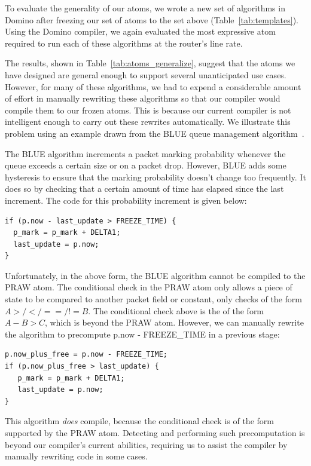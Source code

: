 To evaluate the generality of our atoms, we wrote a new set of algorithms in
Domino after freezing our set of atoms to the set above
(Table~\ref{tab:templates}). Using the Domino compiler, we again evaluated the
most expressive atom required to run each of these algorithms at the router's
line rate.

The results, shown in Table~\ref{tab:atoms_generalize}, suggest that the atoms
we have designed are general enough to support several unanticipated use cases.
However, for many of these algorithms, we had to expend a considerable amount
of effort in manually rewriting these algorithms so that our compiler would
compile them to our frozen atoms. This is because our current compiler is not
intelligent enough to carry out these rewrites automatically. We illustrate
this problem using an example drawn from the BLUE queue management
algorithm~\cite{blue}.

The BLUE algorithm increments a packet marking probability whenever the queue
exceeds a certain size or on a packet drop. However, BLUE adds some hysteresis
to ensure that the marking probability doesn't change too frequently. It does
so by checking that a certain amount of time has elapsed since the last
increment.  The code for this probability increment is given below:

\begin{verbatim}
if (p.now - last_update > FREEZE_TIME) {
  p_mark = p_mark + DELTA1;
  last_update = p.now;
}
\end{verbatim}

Unfortunately, in the above form, the BLUE algorithm cannot be compiled to the
PRAW atom. The conditional check in the PRAW atom only allows a piece of state
to be compared to another packet field or constant, \ie only checks of the form
$A >/</==/!= B$. The conditional check above is the of the form $A - B
> C$, which is beyond the PRAW atom. However, we can manually rewrite the
algorithm to precompute p.now - FREEZE\_TIME in a previous stage:

\begin{verbatim}
p.now_plus_free = p.now - FREEZE_TIME;
if (p.now_plus_free > last_update) {
   p_mark = p_mark + DELTA1;
   last_update = p.now;
}
\end{verbatim}

This algorithm {\em does} compile, because the conditional check is of the form
supported by the PRAW atom. Detecting and performing such precomputation is
beyond our compiler's current abilities, requiring us to assist the compiler by
manually rewriting code in some cases. 

